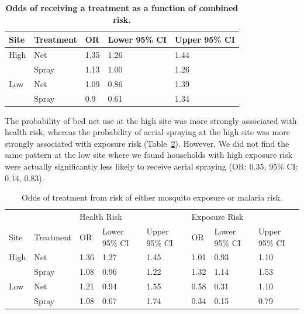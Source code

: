 \documentclass[10pt,letterpaper]{article}\usepackage[]{graphicx}\usepackage[]{color}
\begin{document}
\begin{table}[!ht]
\begin{adjustwidth}{-2.25in}{0in} %
\centering
\caption{
{\bf Odds of receiving a treatment as a function of combined risk.} 
}
\begin{tabular}{lllll}
  \hline 
Site & Treatment & OR & Lower 95\% CI & Upper 95\% CI \\ 
  \hline
High & Net & 1.35 & 1.26 & 1.44 \\ 
   & Spray & 1.13 & 1.00 & 1.26 \\ 
  Low & Net & 1.09 & 0.86 & 1.39 \\ 
   & Spray & 0.9 & 0.61 & 1.34 \\ 
   \hline
\end{tabular}
\label{ORcmb}
\end{adjustwidth}
\end{table}

The probability of bed net use at the high site was more strongly associated with health risk,  whereas the probability of aerial spraying at the high site was more strongly associated with exposure risk (Table~\ref{ORtrt}).  However,  We did not find the same pattern at the low site where we found households with high exposure risk were actually significantly less likely to receive aerial spraying (OR: 0.35,  95\% CI: 0.14,  0.83).  \\







\begin{table}[!ht]
\begin{adjustwidth}{-2.25in}{0in} %
\centering
\caption{
{Odds of treatment from risk of either mosquito exposure or malaria risk.} 
}
\begin{tabular}{llllllll}
  \hline
 &  & \multicolumn{3}{l}{Health Risk} & \multicolumn{3}{l}{Exposure Risk}  \\ 
  
Site & Treatment & OR & Lower 95\% CI & Upper 95\% CI & OR & Lower 95\% CI & Upper 95\% CI \\ 
 \hline
  High & Net & 1.36 & 1.27 & 1.45 & 1.01 & 0.93 & 1.10 \\ 
   & Spray & 1.08 & 0.96 & 1.22 & 1.32 & 1.14 & 1.53 \\ 
  Low & Net & 1.21 & 0.94 & 1.55 & 0.58 & 0.31 & 1.10 \\ 
   & Spray & 1.08 & 0.67 & 1.74 & 0.34 & 0.15 & 0.79 \\ 
   \hline
\end{tabular}
\label{ORtrt}
\end{adjustwidth}
\end{table}
\end{document}
